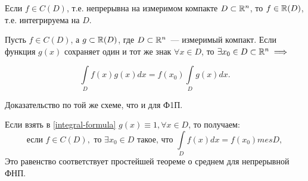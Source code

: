 \documentclass[../main.tex]{subfiles}
\begin{document}
\begin{thm}
	Если $f \in C(D)$, т.е. непрерывна на измеримом компакте
	 $D \subset \mathbb{R}^n$, то $f \in \mathbb{R}(D)$,
	т.е. интегрируема на $D$.
\end{thm}
\begin{crl*}
	Пусть $f \in C(D)$, а $g \subset \mathbb{R}(D)$, где $D \subset \mathbb{R}^n$~---
	 измеримый компакт. Если функция $g(x)$ сохраняет один и 
	 тот же знак $\forall x \in D $, то $\exists x_0 \in D \subset \mathbb{R}^n \implies$
	
	\begin{equation}
	\label{integral-formula}
	\int\limits_D f(x)g(x)dx =
	f(x_0)\int\limits_Dg(x)dx.
	\end{equation}
	
	Доказательство по той же схеме, что и для Ф1П.
\end{crl*}
\begin{rem}
	Если взять в \eqref{integral-formula} 
	$g(x) \equiv 1, \forall x \in D$, то получаем:
	\[
		\text{если } f \in C(D), 
		\text{ то }\exists x_0 \in D 
		\text{ такое, что } \int\limits_Df(x)dx = f(x_0) mes D,
	\]
	Это равенство соответствует простейшей теореме о 
	среднем для непрерывной ФНП.
\end{rem}
\end{document}
